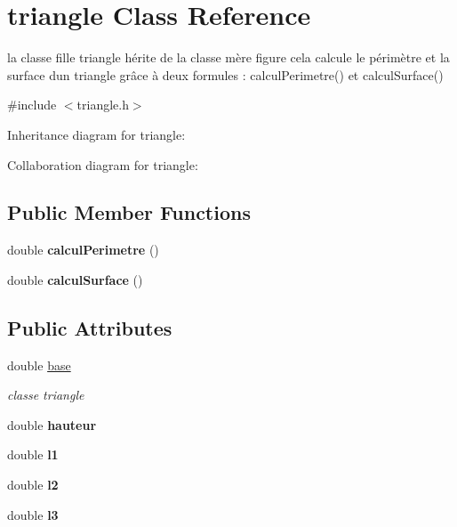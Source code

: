 \hypertarget{classtriangle}{}\section{triangle Class Reference}
\label{classtriangle}


la classe fille triangle hérite de la classe mère figure cela calcule le périmètre et la surface d\textquotesingle{}un triangle grâce à deux formules \+: calcul\+Perimetre() et calcul\+Surface()  




{\ttfamily \#include $<$triangle.\+h$>$}



Inheritance diagram for triangle\+:


Collaboration diagram for triangle\+:
\subsection*{Public Member Functions}
\begin{DoxyCompactItemize}
\item 
\mbox{\label{classtriangle_a413a220f08f938b9ebb202d11c3327e2}} 
double {\bfseries calcul\+Perimetre} ()
\item 
\mbox{\label{classtriangle_ab07820c47e974bf832b681d780326b13}} 
double {\bfseries calcul\+Surface} ()
\end{DoxyCompactItemize}
\subsection*{Public Attributes}
\begin{DoxyCompactItemize}
\item 
double \hyperlink{classtriangle_af13462a5e5804355712bd601871713e7}{base}
\begin{DoxyCompactList}\small\item\em classe triangle \end{DoxyCompactList}\item 
\mbox{\label{classtriangle_a2a28419c49d9640eba8e4f0a3723a210}} 
double {\bfseries hauteur}
\item 
\mbox{\label{classtriangle_a4de2337edbd78eedb124b6b70b81a621}} 
double {\bfseries l1}
\item 
\mbox{\label{classtriangle_a607000f9ce5df9ef5c428ccb32539b7b}} 
double {\bfseries l2}
\item 
\mbox{\label{classtriangle_abf79982f999a24e147f7433275f4997a}} 
double {\bfseries l3}
\end{DoxyCompactItemize}


